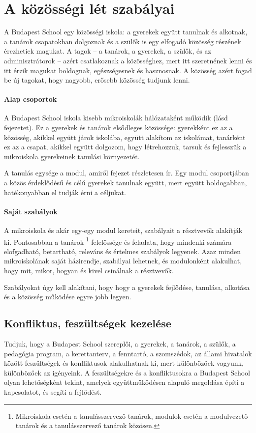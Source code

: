\section{A közösségi lét szabályai}
\label{sec:kozossegilet}
A Budapest School egy közösségi iskola: a gyerekek együtt tanulnak és alkotnak,
a tanárok
csapatokban dolgoznak és a szülők is egy elfogadó közösség részének érezhetiek
magukat. A tagok -- a tanárok, a gyerekek, a szülők,
és az adminisztrátorok -- azért csatlakoznak
a közösséghez, mert itt szeretnének lenni és itt érzik magukat boldognak,
egészségesnek és hasznosnak. A közösség azért fogad be új tagokat, hogy
nagyobb, erősebb közösség tudjunk lenni.

\paragraph{Alap csoportok} A Budapest School iskola kisebb mikroiskolák
hálózataként működik (lásd  fejezetet).
Ez a gyerekek és tanárok elsődleges közössége: gyerekként ez az a közösség,
akikkel együtt járok iskolába, együtt alakítom az iskolámat,
tanárként ez az a csapat, akikkel együtt dolgozom, hogy létrehozzuk, tarsuk és
fejlesszük a mikroiskola gyerekeinek tanulási környezetét.

A tanulás egysége a modul, amiről  fejezet részletesen ír.
Egy modul csoportjában a közös érdeklődésű és célú gyerekek tanulnak együtt,
mert együtt boldogabban, hatékonyabban el tudják érni a céljukat.

\paragraph{Saját szabályok}

A mikroiskola és akár egy-egy modul kereteit,
szabályait a résztvevők alakítják ki. Pontosabban a tanárok
\footnote{Mikroiskola esetén a tanulásszervező tanárok, modulok
      esetén a modulvezető tanárok és a tanulásszervező tanárok közösen.}
felelőssége és
feladata, hogy mindenki számára elofgadható, betartható, releváns és értelmes
szabályok
legyenek. Azaz minden mikroiskolának saját házirendje, szabályai
lehetnek, és modulonként alakulhat, hogy mit, mikor, hogyan és kivel csinálnak
a résztvevők.

Szabályokat úgy kell alakítani, hogy
hogy a gyerekek fejlődése, tanulása, alkotása és a közösség működése egyre jobb
legyen.

\subsection{Konfliktus, feszültségek kezelése}
\label{sec:konfliktusok_kezelese}
Tudjuk, hogy a Budapest School szereplői, a gyerekek, a tanárok, a szülők,
a pedagógia program, a kerettanterv, a fenntartó, a szomszédok, az állami
hivatalok  között feszültségek és konfliktusok alakulhatnak ki, mert
különbözőek vagyunk, különbözőek az igényeink. A feszültségekre és a
konfliktusokra a Budapest School olyan lehetőségként tekint, amelyek
együttműködésen alapuló megoldása építi a kapcsolatot, és segíti a fejlődést.

